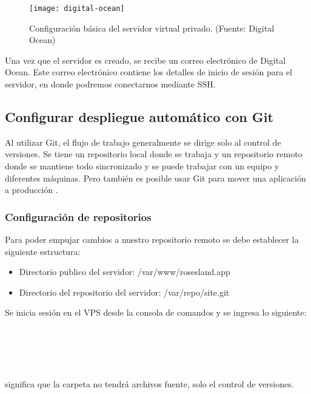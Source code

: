 \begin{figure}[H]
  \centering
  \texttt{[image: digital-ocean]}
  \caption{Configuración básica del servidor virtual privado. (Fuente: Digital Ocean)}
  \label{digital-ocean}
\end{figure}

Una vez que el servidor es creado, se recibe un correo electrónico de Digital Ocean. Este correo electrónico contiene los detalles de inicio de sesión para el servidor, en donde podremos conectarnos mediante SSH.
\vspace{0.8cm}

\subsection{Configurar despliegue automático con Git}
Al utilizar Git, el flujo de trabajo generalmente se dirige solo al control de versiones. Se tiene un repositorio local donde se trabaja y un repositorio remoto donde se mantiene todo sincronizado y se puede trabajar con un equipo y diferentes máquinas. Pero también es posible usar Git para mover una aplicación a producción \cite{vaccaro}.
\vspace{0.8cm}

\subsubsection{Configuración de repositorios}
Para poder empujar cambios a nuestro repositorio remoto se debe establecer la siguiente estructura:

\begin{itemize}
  \item Directorio publico del servidor: /var/www/rosesland.app
  \item Directorio del repositorio del servidor: /var/repo/site.git
\end{itemize}

Se inicia sesión en el VPS desde la consola de comandos y se ingresa lo siguiente:\\
\\
\\
\\
\\
\\

 significa que la carpeta no tendrá archivos fuente, solo el control de versiones.

